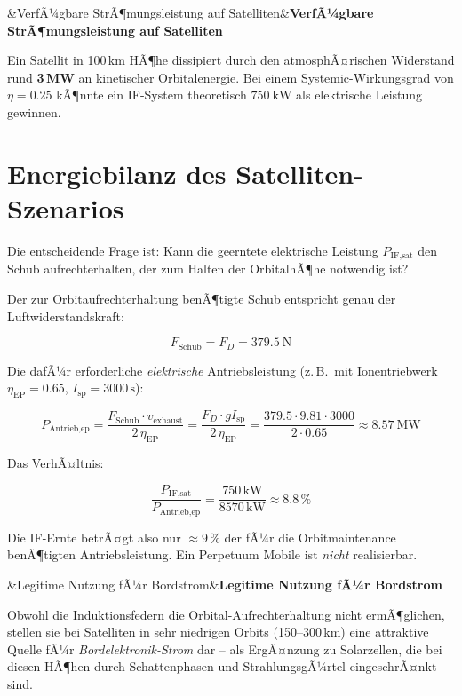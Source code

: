 ﻿\documentclass[12pt, a4paper]{report}
\newenvironment{ergebnis}[1][]{%
  \begin{ergebnisframe}\sloppy%
  \ifx&#1&\else\textbf{#1}\par\smallskip\fi}{\end{ergebnisframe}}
\theoremstyle{definition}
\theoremstyle{remark}
\begin{document}
\begin{ergebnis}[VerfÃ¼gbare StrÃ¶mungsleistung auf Satelliten]
  Ein Satellit in 100\,km HÃ¶he dissipiert durch den atmosphÃ¤rischen Widerstand
  rund \textbf{3\,MW} an kinetischer Orbitalenergie. Bei einem Systemic-Wirkungsgrad
  von $\eta = 0.25$ kÃ¶nnte ein IF-System theoretisch $\SI{750}{\kilo\watt}$
  als elektrische Leistung gewinnen.
\end{ergebnis}

\section{Energiebilanz des Satelliten-Szenarios}

Die entscheidende Frage ist: Kann die geerntete elektrische Leistung $P_{\text{IF,sat}}$
den Schub aufrechterhalten, der zum Halten der OrbitalhÃ¶he notwendig ist?

Der zur Orbit\-aufrechterhaltung benÃ¶tigte Schub entspricht genau der
Luftwiderstandskraft:

\begin{equation}
  F_{\text{Schub}} = F_D = \SI{379.5}{\newton}
  \label{eq:f_schub}
\end{equation}

Die dafÃ¼r erforderliche \emph{elektrische} Antriebsleistung (z.\,B.\ mit
Ionen\-triebwerk $\eta_{\text{EP}} = 0.65$, $I_{\text{sp}} = 3000\,\text{s}$):

\begin{equation}
  P_{\text{Antrieb,ep}} = \frac{F_{\text{Schub}} \cdot v_{\text{exhaust}}}{2\,\eta_{\text{EP}}}
  = \frac{F_D \cdot g I_{\text{sp}}}{2\,\eta_{\text{EP}}}
  = \frac{379.5 \cdot 9.81 \cdot 3000}{2 \cdot 0.65}
  \approx \SI{8.57}{\mega\watt}
  \label{eq:p_antrieb_ep}
\end{equation}

Das VerhÃ¤ltnis:

\begin{equation}
  \frac{P_{\text{IF,sat}}}{P_{\text{Antrieb,ep}}} = \frac{750\,\text{kW}}{8570\,\text{kW}} \approx 8.8\,\%
  \label{eq:ratio_sat}
\end{equation}

Die IF-Ernte betrÃ¤gt also nur $\approx 9\,\%$ der fÃ¼r die Orbitmaintenance
benÃ¶tigten Antriebsleistung. Ein Perpetuum Mobile ist \emph{nicht} realisierbar.

\begin{ergebnis}[Legitime Nutzung fÃ¼r Bordstrom]
  Obwohl die Induktionsfedern die Orbital-Aufrechterhaltung nicht ermÃ¶glichen,
  stellen sie bei Satelliten in sehr niedrigen Orbits (150--300\,km) eine
  attraktive Quelle fÃ¼r \emph{Bordelektronik-Strom} dar -- als ErgÃ¤nzung zu
  Solar\-zellen, die bei diesen HÃ¶hen durch Schattenphasen und StrahlungsgÃ¼rtel
  eingeschrÃ¤nkt sind.
\end{ergebnis}
\end{document}
